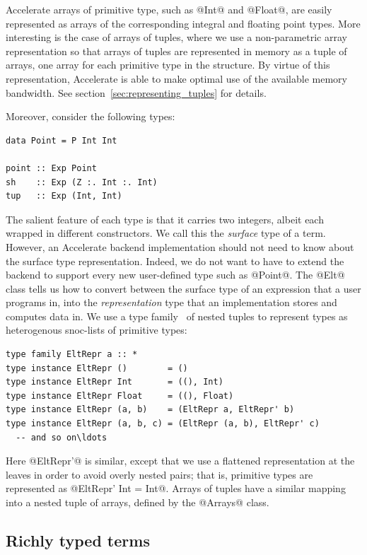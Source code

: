 Accelerate arrays of primitive type, such as @Int@ and @Float@, are easily
represented as arrays of the corresponding integral and floating point types.
More interesting is the case of arrays of tuples, where we use a non-parametric
array representation so that arrays of tuples are represented in memory as a
tuple of arrays, one array for each primitive type in the structure. By virtue
of this representation, Accelerate is able to make optimal use of the available
memory bandwidth. See section~\ref{sec:representing_tuples} for details.

Moreover, consider the following types:
%
\begin{lstlisting}[style=haskell]
data Point = P Int Int

point :: Exp Point
sh    :: Exp (Z :. Int :. Int)
tup   :: Exp (Int, Int)
\end{lstlisting}
%
The salient feature of each type is that it carries two integers, albeit each
wrapped in different constructors. We call this the
\emph{surface} type of a term. However, an Accelerate
backend implementation should not need to know about the surface type
representation. Indeed, we do not want to have to extend the backend to support
every new user-defined type such as @Point@. The @Elt@ class tells us how to
convert between the surface type of an expression that a user programs in, into
the \emph{representation} type that an implementation
stores and computes data in. We use a type
family~\cite{Chakravarty:2005dx,Schrijvers:2008ir} of nested tuples to represent
types as heterogenous snoc-lists of primitive types:
%
\begin{lstlisting}[style=haskell]
type family EltRepr a :: *
type instance EltRepr ()        = ()
type instance EltRepr Int       = ((), Int)
type instance EltRepr Float     = ((), Float)
type instance EltRepr (a, b)    = (EltRepr a, EltRepr' b)
type instance EltRepr (a, b, c) = (EltRepr (a, b), EltRepr' c)
  -- and so on\ldots
\end{lstlisting}
%
Here @EltRepr'@ is similar, except that we use a flattened representation at the
leaves in order to avoid overly nested pairs; that is, primitive types are
represented as @EltRepr' Int = Int@. Arrays of tuples have a similar mapping
into a nested tuple of arrays, defined by the @Arrays@ class.


\subsection{Richly typed terms}
\label{sec:richly_typed_terms}

